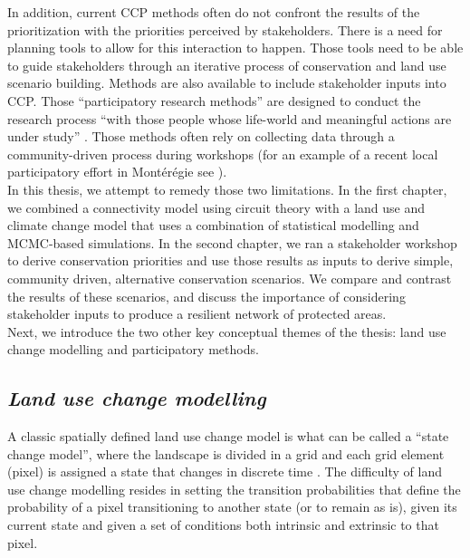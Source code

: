\documentclass[12pt,Bold,TexShade]{thesis/mcgilletdclass}
\begin{document}
{In addition, current CCP methods often do not confront the results of the prioritization with the priorities perceived by stakeholders. There is a need for planning tools to allow for this interaction to happen. Those tools need to be able to guide stakeholders through an iterative process of conservation and land use scenario building. Methods are also available to include stakeholder inputs into CCP. Those “participatory research methods” are designed to conduct the research process “with those people whose life-world and meaningful actions are under study” \citep{bergold_participatory_2012}. Those methods often rely on collecting data through a community-driven process during workshops (for an example of a recent local participatory effort in Montérégie see \cite{martins_results_2020}). \\

In this thesis, we attempt to remedy those two limitations. In the first chapter, we combined a connectivity model using circuit theory with a land use and climate change model that uses a combination of statistical modelling and MCMC-based simulations. In the second chapter, we ran a stakeholder workshop to derive conservation priorities and use those results as inputs to derive simple, community driven, alternative conservation scenarios. We compare and contrast the results of these scenarios, and discuss the importance of considering stakeholder inputs to produce a resilient network of protected areas. \\

Next, we introduce the two other key conceptual themes of the thesis: land use change modelling and participatory methods. \\ \vspace{2em}

\subsection*{\textit{Land use change modelling \\ \vspace{1em}}}

A classic spatially defined land use change model is what can be called a “state change model”, where the landscape is divided in a grid and each grid element (pixel) is assigned a state that changes in discrete time \citep{daniel_state-and-transition_2016}. The difficulty of land use change modelling resides in setting the transition probabilities that define the probability of a pixel transitioning to another state (or to remain as is), given its current state and given a set of conditions both intrinsic and extrinsic to that pixel. \\

}
\end{document}

